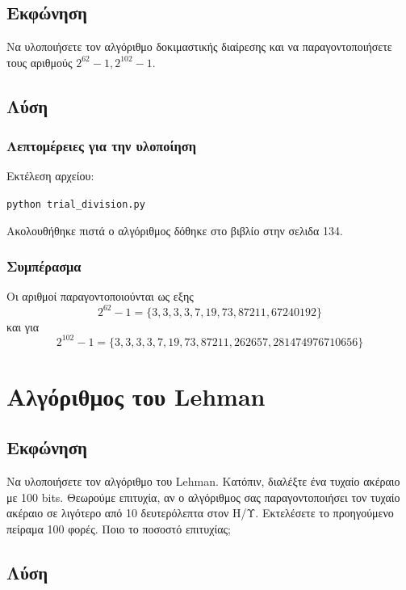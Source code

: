 \documentclass[oneside]{article}
\let\t\texttt
\begin{document}
\subsection{Εκφώνηση}

Να υλοποιήσετε τον αλγόριθμο δοκιμαστικής διαίρεσης και να παραγοντοποιήσετε τους αριθμούς $2^{62} - 1, 2^{102} - 1$.

\subsection{Λύση} 

\subsubsection{Λεπτομέρειες για την υλοποίηση}

Εκτέλεση αρχείου:

\begin{center}
    \t{python trial_division.py}
\end{center}

Ακολουθήθηκε πιστά ο αλγόριθμος δόθηκε στο βιβλίο \cite{draz:2022} στην σελιδα 134.

\subsubsection{Συμπέρασμα}

Οι αριθμοί παραγοντοποιούνται ως εξης
\[
    2 ^{62} - 1 =  \{ 3, 3, 3, 3, 7, 19, 73, 87211, 67240192 \}
\] και για 
\[
    2 ^ {102} - 1 =  \{3, 3, 3, 3, 7, 19, 73, 87211, 262657, 281474976710656\}
\]

\section{Αλγόριθμος του Lehman}

\subsection{Εκφώνηση} 

Να υλοποιήσετε τον αλγόριθμο του Lehman. Κατόπιν, διαλέξτε ένα τυχαίο ακέραιο με 100 bits. Θεωρούμε επιτυχία, αν ο αλγόριθμος σας παραγοντοποιήσει τον τυχαίο ακέραιο σε λιγότερο από 10 δευτερόλεπτα στον Η/Υ. Εκτελέσετε το προηγούμενο πείραμα 100 φορές. Ποιο το ποσοστό επιτυχίας;

\subsection{Λύση}
\end{document}
